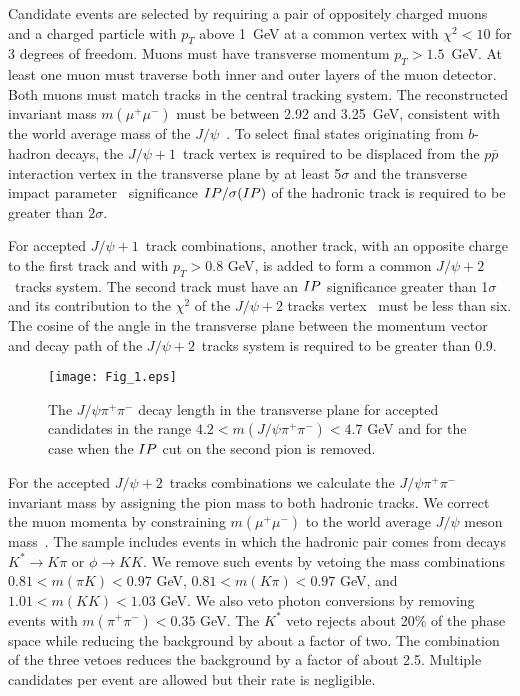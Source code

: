 \documentclass[aps,prd,twocolumn,superscriptaddress,groupedaddress,floatfix]{revtex4}
\begin{document}
Candidate events  are selected  by requiring  a pair of oppositely charged  muons
and  a charged particle  with $p_T$ above  1~GeV   at a common vertex  with
 $\chi^2 < 10$ for 3 degrees of freedom.   
Muons  must 
   have transverse momentum $p_T > 1.5$~GeV.
At least one muon must traverse both inner and outer layers of the muon detector.
 Both muons must match tracks 
in the central tracking system. The reconstructed invariant mass $m(\mu^+\mu^-)$ 
must be between 2.92 and 3.25~GeV, 
consistent with the world average mass of the $J/\psi$~\cite{pdg}.
To select final states originating from $b$-hadron decays,
the  $J/\psi +1$~track vertex is required to be  displaced from
the $p\bar{p}$  interaction vertex in the transverse plane by at least 5$\sigma$ and
 the transverse impact parameter~\cite{ip}
 significance ${\sl IP}/\sigma({\sl }IP)$ 
of the hadronic track is required to be greater than $2\sigma$.



For accepted $J/\psi +1$~track combinations,  another track,
 with an opposite charge to the first track and  with $p_T>0.8$ GeV,
is added to form  a common $J/\psi +2$~tracks system. 
The second track must have an  ${\sl IP}$ significance greater than 1$\sigma$ 
and its contribution to the  $\chi^2$ of the $J/\psi +2$ tracks   vertex~\cite{vertex} must be  less
than six. The cosine of the  angle in the transverse plane between the momentum vector and decay path
of  the  $J/\psi +2$~tracks system is required to be greater
than 0.9.



\begin{figure}[htb]
\texttt{[image: Fig\_1.eps]}
\caption{\label{fig:Lxy} 
The $J/\psi \pi^+ \pi^-$ decay length  in the transverse plane for accepted candidates in the range
  $4.2<m(J/\psi \pi^+ \pi^-)<4.7$ GeV 
and for
the case when the ${\sl IP}$ cut on the second pion is removed.
}
\end{figure}

For the accepted  $J/\psi +2$~tracks combinations we calculate the $J/\psi \pi^+ \pi^-$
invariant mass  by assigning the pion mass to both hadronic tracks.
We correct the muon momenta by 
 constraining $m(\mu^+\mu^-)$ to the world average $J/\psi$ meson  mass~\cite{pdg}. 
The sample includes events in which  the hadronic pair comes from decays
$K^* \rightarrow K \pi$ or $\phi \rightarrow K K$.
We remove such events by vetoing the mass combinations
$0.81<m(\pi K)<0.97$ GeV, $0.81<m(K \pi)<0.97$ GeV, and  $1.01<m(K K)<1.03$ GeV.
We also veto photon conversions by removing events with  $m(\pi^+ \pi^-)<0.35$ GeV.
The $K^*$ veto rejects about 20\% of the phase space while  reducing  the background
by about a factor of two.  The combination of the three vetoes reduces the background by
a factor  of about 2.5. 
Multiple candidates per event are allowed but their rate is negligible.
\end{document}
